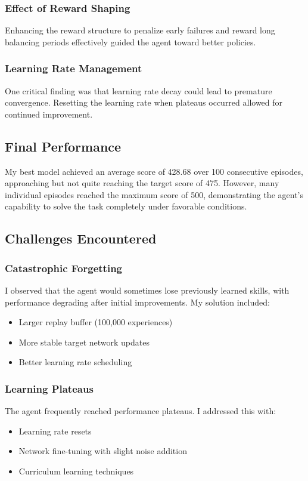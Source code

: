 \documentclass[11pt,a4paper]{article}
\begin{document}
\subsubsection{Effect of Reward Shaping}
Enhancing the reward structure to penalize early failures and reward long balancing periods effectively guided the agent toward better policies.

\subsubsection{Learning Rate Management}
One critical finding was that learning rate decay could lead to premature convergence. Resetting the learning rate when plateaus occurred allowed for continued improvement.

\subsection{Final Performance}

My best model achieved an average score of 428.68 over 100 consecutive episodes, approaching but not quite reaching the target score of 475. However, many individual episodes reached the maximum score of 500, demonstrating the agent's capability to solve the task completely under favorable conditions.

\subsection{Challenges Encountered}

\subsubsection{Catastrophic Forgetting}
I observed that the agent would sometimes lose previously learned skills, with performance degrading after initial improvements. My solution included:
\begin{itemize}
    \item Larger replay buffer (100,000 experiences)
    \item More stable target network updates
    \item Better learning rate scheduling
\end{itemize}

\subsubsection{Learning Plateaus}
The agent frequently reached performance plateaus. I addressed this with:
\begin{itemize}
    \item Learning rate resets
    \item Network fine-tuning with slight noise addition
    \item Curriculum learning techniques
\end{itemize}
\end{document}
